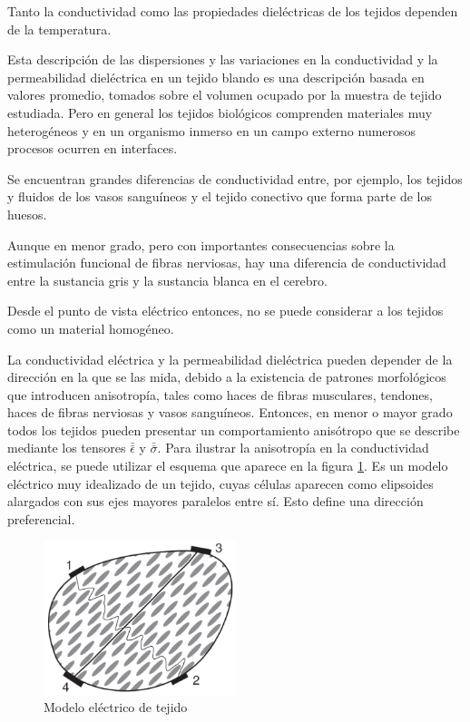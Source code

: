Tanto la conductividad como las propiedades dieléctricas de los tejidos dependen de la temperatura.

Esta descripción de las dispersiones y las variaciones en la conductividad y la permeabilidad dieléctrica en un tejido blando es una descripción basada en valores promedio, tomados sobre el volumen ocupado por la muestra de tejido estudiada. Pero en general los tejidos biológicos comprenden materiales muy heterogéneos y en un organismo inmerso en un campo externo numerosos procesos ocurren en interfaces.

Se encuentran grandes diferencias de conductividad entre, por ejemplo, los tejidos y fluidos de los vasos sanguíneos y el tejido conectivo que forma parte de los huesos.

Aunque en menor grado, pero con importantes consecuencias sobre la estimulación funcional
de fibras nerviosas, hay una diferencia de conductividad entre la sustancia gris y la sustancia
blanca en el cerebro.

Desde el punto de vista eléctrico entonces, no se puede considerar a los tejidos como un
material homogéneo.

La conductividad eléctrica y la permeabilidad dieléctrica pueden depender de la dirección en la
que se las mida, debido a la existencia de patrones morfológicos que introducen anisotropía,
tales como haces de fibras musculares, tendones, haces de fibras nerviosas y vasos sanguíneos.
Entonces, en menor o mayor grado todos los tejidos pueden presentar un comportamiento
anisótropo que se describe mediante los tensores $\bar{\bar{\epsilon}}$ y $\bar{\bar{\sigma}}$.
Para ilustrar la anisotropía en la conductividad eléctrica, se puede utilizar el esquema que
aparece en la figura \ref{fig:66}. Es un modelo eléctrico muy idealizado de un tejido, cuyas células aparecen como elipsoides alargados con sus ejes mayores paralelos entre sí. Esto define una dirección preferencial.

\begin{figure}[H]
    \centering
    \includegraphics[width=0.5\textwidth]{./Figures/fig66}
	\caption{Modelo eléctrico de tejido}
	\label{fig:66}
\end{figure}

